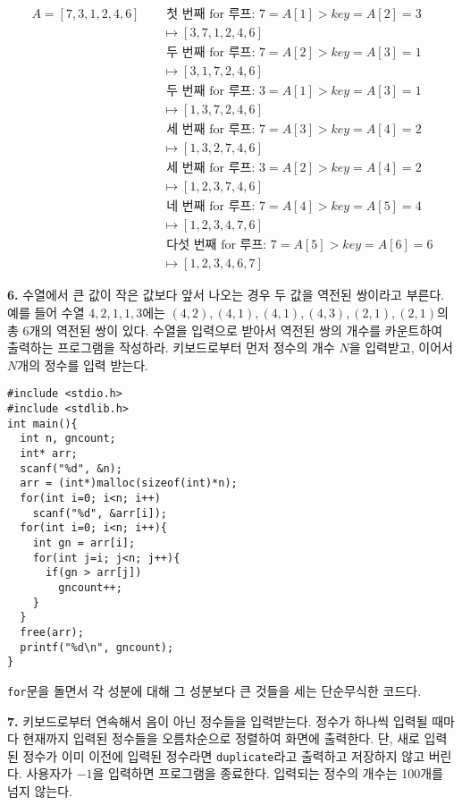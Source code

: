 \documentclass[a4paper,chapter,atbegshi]{oblivoir}
\begin{document}
\begin{align*}
  A =
  [7,3,1,2,4,6]\quad &\textrm{ 첫 번째 for 루프: }7=A[1]>key=A[2]=3 \\ 
                &\mapsto [3,7,1,2,4,6]\\
                & \textrm{ 두 번째 for 루프: }7=A[2]>key=A[3]=1\\
                &\mapsto [3,1,7,2,4,6] \\
                & \textrm{ 두 번째 for 루프: }3=A[1]>key=A[3]=1 \\
                &\mapsto [1,3,7,2,4,6] \\
                &\textrm{ 세 번째 for 루프: }7=A[3]>key=A[4]=2\\
                &\mapsto [1,3,2,7,4,6] \\
                &\textrm{ 세 번째 for 루프: }3=A[2]>key=A[4]=2\\
                &\mapsto [1,2,3,7,4,6] \\
                &\textrm{ 네 번째 for 루프: }7=A[4]>key=A[5]=4\\
                &\mapsto [1,2,3,4,7,6]\\
                &\textrm{ 다섯 번째 for 루프: }7=A[5]>key=A[6]=6\\
                &\mapsto [1,2,3,4,6,7]
\end{align*}
\begin{mdframed}\textbf{6. }
  수열에서 큰 값이 작은 값보다 앞서 나오는 경우 두 값을 역전된 쌍이라고 부른다.
  예를 들어 수열 $4,2,1,1,3$에는 $(4,2),(4,1),(4,1),(4,3),(2,1),(2,1)$의 총
  6개의 역전된 쌍이 있다. 수열을 입력으로 받아서 역전된 쌍의 개수를 카운트하여
  출력하는 프로그램을 작성하라. 키보드로부터 먼저 정수의 개수 $N$을 입력받고,
  이어서 $N$개의 정수를 입력 받는다.
\end{mdframed}
\begin{lstlisting}[style=C]
#include <stdio.h>
#include <stdlib.h>
int main(){
  int n, gncount;
  int* arr;
  scanf("%d", &n);
  arr = (int*)malloc(sizeof(int)*n);
  for(int i=0; i<n; i++)
    scanf("%d", &arr[i]);
  for(int i=0; i<n; i++){
    int gn = arr[i];
    for(int j=i; j<n; j++){
      if(gn > arr[j])
        gncount++;
    }
  }
  free(arr);
  printf("%d\n", gncount);
}
\end{lstlisting}
\texttt{for}문을 돌면서 각 성분에 대해 그 성분보다 큰 것들을 세는 단순무식한
코드다.
\hfill\break
\begin{mdframed}\textbf{7. }
  키보드로부터 연속해서 음이 아닌 정수들을 입력받는다. 정수가 하나씩 입력될
  때마다 현재까지 입력된 정수들을 오름차순으로 정렬하여 화면에 출력한다. 단,
  새로 입력된 정수가 이미 이전에 입력된 정수라면 \texttt{duplicate}라고 출력하고
  저장하지 않고 버린다. 사용자가 $-1$을 입력하면 프로그램을 종료한다. 입력되는
  정수의 개수는 100개를 넘지 않는다.
\end{mdframed}
\end{document}
